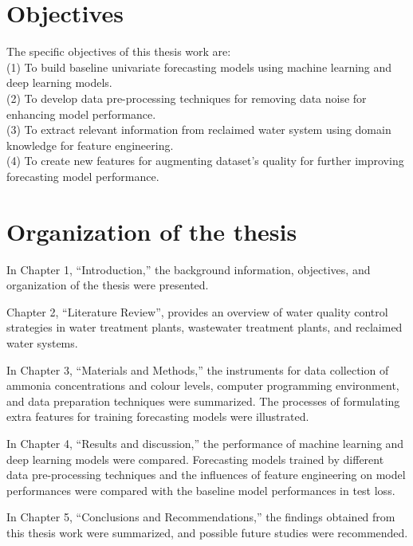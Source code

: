 \section{Objectives}
\noindent
The specific objectives of this thesis work are:\\
(1) To build baseline univariate forecasting models using machine learning and deep learning models.\\
(2) To develop data pre-processing techniques for removing data noise for enhancing model performance.\\
(3) To extract relevant information from reclaimed water system using domain knowledge for feature engineering.\\
(4) To create new features for augmenting dataset's quality for further improving forecasting model performance.

\section{Organization of the thesis}
In Chapter 1, “Introduction,” the background information, objectives, and organization of the thesis were presented.

Chapter 2, “Literature Review”, provides an overview of water quality control strategies in water treatment plants, wastewater treatment plants, and reclaimed water systems.

In Chapter 3, “Materials and Methods,” the instruments for data collection of ammonia concentrations and colour levels, computer programming environment, and data preparation techniques were summarized. The processes of formulating extra features for training forecasting models were illustrated.

In Chapter 4, “Results and discussion,” the performance of machine learning and deep learning models were compared. Forecasting models trained by different data pre-processing techniques and the influences of feature engineering on model performances were compared with the baseline model performances in test loss. 

In Chapter 5, “Conclusions and Recommendations,” the findings obtained from this thesis work were summarized, and possible future studies were recommended.